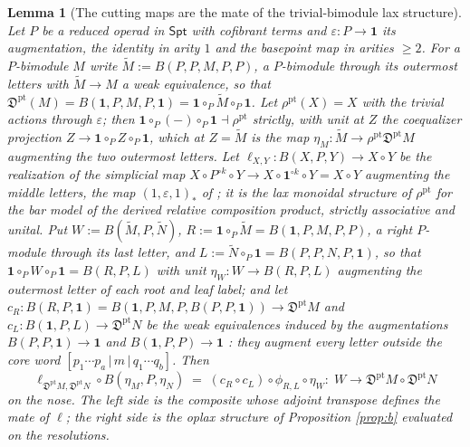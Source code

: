 \documentclass[11pt]{amsart}
\newtheorem{lemma}[subsection]{Lemma}
\theoremstyle{definition}
\theoremstyle{remark}
\newcommand{\Spt}{\mathsf{Spt}}
\newcommand{\unit}{\mathbf{1}}
\newcommand{\Fptpt}{\mathfrak{D}^{\mathrm{pt}}}
\begin{document}
\begin{lemma}[The cutting maps are the mate of the trivial-bimodule lax structure]\label{lem:mate}
Let $P$ be a reduced operad in $\Spt$ with cofibrant terms and $\varepsilon\colon P\to\unit$ its augmentation, the identity in arity $1$ and the basepoint map in arities $\geq2$. For a $P$-bimodule $M$ write $\widetilde M:=B(P,P,M,P,P)$, a $P$-bimodule through its outermost letters \cite[Definition 7.20, Remark 7.21]{AC1} with $\widetilde M\to M$ a weak equivalence, so that $\Fptpt(M)=B(\unit,P,M,P,\unit)=\unit\circ_P\widetilde M\circ_P\unit$. Let $\rho^{\mathrm{pt}}(X)=X$ with the trivial actions through $\varepsilon$; then $\unit\circ_P(-)\circ_P\unit\dashv\rho^{\mathrm{pt}}$ strictly, with unit at $Z$ the coequalizer projection $Z\to\unit\circ_P Z\circ_P\unit$, which at $Z=\widetilde M$ is the map $\eta_M\colon\widetilde M\to\rho^{\mathrm{pt}}\Fptpt M$ augmenting the two outermost letters. Let $\ell_{X,Y}\colon B(X,P,Y)\to X\circ Y$ be the realization of the simplicial map $X\circ P^{\circ k}\circ Y\to X\circ\unit^{\circ k}\circ Y=X\circ Y$ augmenting the middle letters, the map $(1,\varepsilon,1)_*$ of \cite[Definition 8.3]{AC1}; it is the lax monoidal structure of $\rho^{\mathrm{pt}}$ for the bar model of the derived relative composition product, strictly associative and unital. Put $W:=B(\widetilde M,P,\widetilde N)$, $R:=\unit\circ_P\widetilde M=B(\unit,P,M,P,P)$, a right $P$-module through its last letter, and $L:=\widetilde N\circ_P\unit=B(P,P,N,P,\unit)$, so that $\unit\circ_P W\circ_P\unit=B(R,P,L)$ with unit $\eta_W\colon W\to B(R,P,L)$ augmenting the outermost letter of each root and leaf label; and let $c_R\colon B(R,P,\unit)=B(\unit,P,M,P,B(P,P,\unit))\to\Fptpt M$ and $c_L\colon B(\unit,P,L)\to\Fptpt N$ be the weak equivalences induced by the augmentations $B(P,P,\unit)\to\unit$ and $B(\unit,P,P)\to\unit$ \cite[Definition 8.3, Corollary 8.8]{AC1}: they augment every letter outside the core word $[p_1\cdots p_a\,|\,m\,|\,q_1\cdots q_b]$. Then
\[ \ell_{\Fptpt M,\Fptpt N}\circ B(\eta_M,P,\eta_N)\;=\;(c_R\circ c_L)\circ\phi_{R,L}\circ\eta_W\colon\;W\longrightarrow\Fptpt M\circ\Fptpt N \]
on the nose. The left side is the composite whose adjoint transpose defines the mate of $\ell$; the right side is the oplax structure of Proposition \ref{prop:b} evaluated on the resolutions.
\end{lemma}
\end{document}

